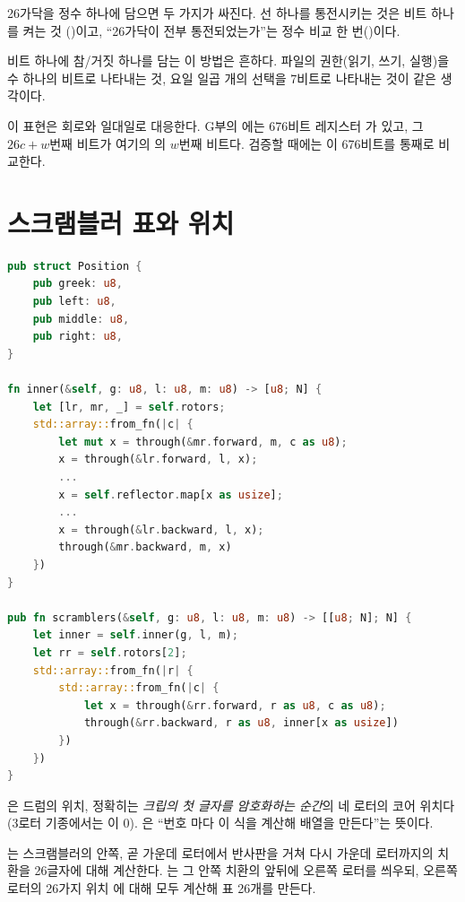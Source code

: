 \Why 26가닥을 정수 하나에 담으면 두 가지가 싸진다. 선 하나를 통전시키는 것은 비트 하나를 켜는 것
()이고, ``26가닥이 전부 통전되었는가''는 정수 비교 한 번()이다.

\General 비트 하나에 참/거짓 하나를 담는 이 방법은 흔하다. 파일의 권한(읽기, 쓰기, 실행)을 수 하나의 비트로
나타내는 것, 요일 일곱 개의 선택을 7비트로 나타내는 것이 같은 생각이다.

\Ours 이 표현은 회로와 일대일로 대응한다. G부의 에는 676비트 레지스터 가
있고, 그 $26c + w$번째 비트가 여기의 의 $w$번째 비트다. 검증할 때에는 이 676비트를 통째로
비교한다.

\section{스크램블러 표와 위치}

\begin{lstlisting}[language=Rust,caption={\code{bombe.rs}: 드럼 위치와 스크램블러 표(주석 생략, 그리스 로터 부분 생략).},label={lst:scramblers}]
pub struct Position {
    pub greek: u8,
    pub left: u8,
    pub middle: u8,
    pub right: u8,
}

fn inner(&self, g: u8, l: u8, m: u8) -> [u8; N] {
    let [lr, mr, _] = self.rotors;
    std::array::from_fn(|c| {
        let mut x = through(&mr.forward, m, c as u8);
        x = through(&lr.forward, l, x);
        ...
        x = self.reflector.map[x as usize];
        ...
        x = through(&lr.backward, l, x);
        through(&mr.backward, m, x)
    })
}

pub fn scramblers(&self, g: u8, l: u8, m: u8) -> [[u8; N]; N] {
    let inner = self.inner(g, l, m);
    let rr = self.rotors[2];
    std::array::from_fn(|r| {
        std::array::from_fn(|c| {
            let x = through(&rr.forward, r as u8, c as u8);
            through(&rr.backward, r as u8, inner[x as usize])
        })
    })
}
\end{lstlisting}

은 드럼의 위치, 정확히는 \emph{크립의 첫 글자를 암호화하는 순간}의 네 로터의 코어 위치다
(3로터 기종에서는 이 0). 은 ``번호 마다 이 식을 계산해
배열을 만든다''는 뜻이다.

는 스크램블러의 안쪽, 곧 가운데 로터에서 반사판을 거쳐 다시 가운데 로터까지의 치환을 26글자에
대해 계산한다. 는 그 안쪽 치환의 앞뒤에 오른쪽 로터를 씌우되, 오른쪽 로터의 26가지 위치
에 대해 모두 계산해 표 26개를 만든다.


